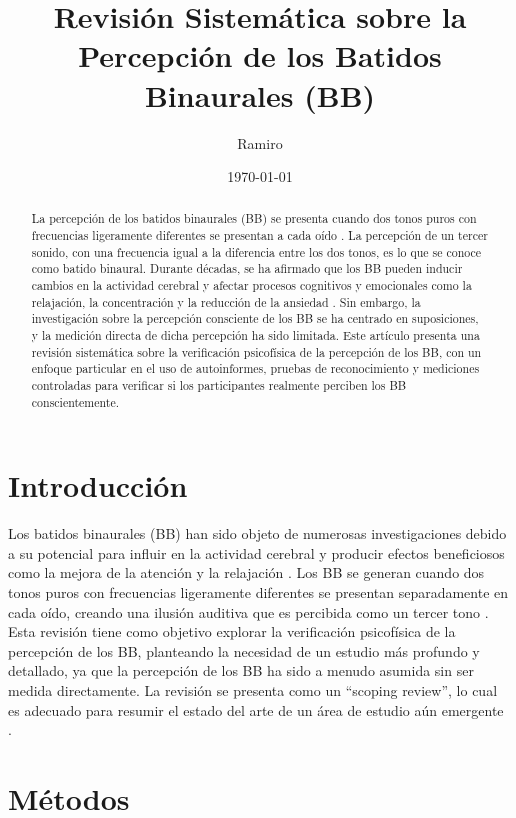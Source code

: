 \documentclass{article}
\title{Revisión Sistemática sobre la Percepción de los Batidos Binaurales (BB)}
\author{Ramiro}
\date{\today}
\begin{document}
\maketitle

\begin{abstract}
La percepción de los batidos binaurales (BB) se presenta cuando dos tonos puros con frecuencias ligeramente diferentes se presentan a cada oído \citep{shamma2001representation}. La percepción de un tercer sonido, con una frecuencia igual a la diferencia entre los dos tonos, es lo que se conoce como batido binaural. Durante décadas, se ha afirmado que los BB pueden inducir cambios en la actividad cerebral y afectar procesos cognitivos y emocionales como la relajación, la concentración y la reducción de la ansiedad \citep{sudre2024binaural}. Sin embargo, la investigación sobre la percepción consciente de los BB se ha centrado en suposiciones, y la medición directa de dicha percepción ha sido limitada. Este artículo presenta una revisión sistemática sobre la verificación psicofísica de la percepción de los BB, con un enfoque particular en el uso de autoinformes, pruebas de reconocimiento y mediciones controladas para verificar si los participantes realmente perciben los BB conscientemente.
\end{abstract}

\section{Introducción}
Los batidos binaurales (BB) han sido objeto de numerosas investigaciones debido a su potencial para influir en la actividad cerebral y producir efectos beneficiosos como la mejora de la atención y la relajación \citep{becher2015synchronization}. Los BB se generan cuando dos tonos puros con frecuencias ligeramente diferentes se presentan separadamente en cada oído, creando una ilusión auditiva que es percibida como un tercer tono \citep{solca2015coherence}. Esta revisión tiene como objetivo explorar la verificación psicofísica de la percepción de los BB, planteando la necesidad de un estudio más profundo y detallado, ya que la percepción de los BB ha sido a menudo asumida sin ser medida directamente. La revisión se presenta como un ``scoping review'', lo cual es adecuado para resumir el estado del arte de un área de estudio aún emergente \citep{sudre2024binaural}.

\section{Métodos}
\end{document}
